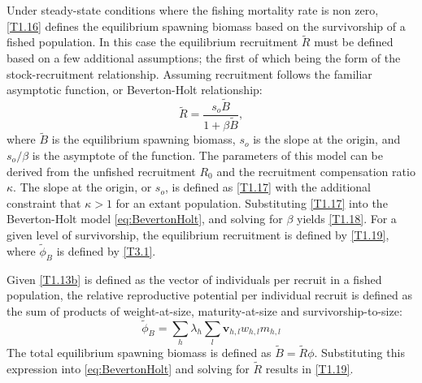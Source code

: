 \documentclass[12pt,letterpaper]{article}
\begin{document}
    Under steady-state conditions where the fishing mortality rate is non zero, \eqref{T1.16} defines the equilibrium spawning biomass based on the survivorship of a fished population.  In this case the equilibrium recruitment $\tilde{R}$ must be defined based on a few additional assumptions; the first of which being the form of the stock-recruitment relationship.  Assuming recruitment follows the familiar asymptotic function, or Beverton-Holt relationship:
    \begin{equation} \label{eq:BevertonHolt}
      \tilde{R} = \frac{s_o \tilde{B}}{1 + \beta \tilde{B}},
    \end{equation}
    where $\tilde{B}$ is the equilibrium spawning biomass, $s_o$ is the slope at the origin, and $s_o/\beta$ is the asymptote of the function. The parameters of this model can be derived from the unfished recruitment $R_0$ and the recruitment compensation ratio $\kappa$.  The slope at the origin, or $s_o$, is defined as \eqref{T1.17} with the additional constraint that $\kappa > 1$ for an extant population.  Substituting \eqref{T1.17} into the Beverton-Holt model \eqref{eq:BevertonHolt}, and solving  for $\beta$ yields \eqref{T1.18}.  For a given level of survivorship, the equilibrium recruitment is defined by \eqref{T1.19}, where $\tilde{\phi}_B$ is defined by \eqref{T3.1}.

    Given \eqref{T1.13b} is defined as the vector of individuals per recruit in a fished population, the relative reproductive potential per individual recruit is defined as the sum of products of weight-at-size, maturity-at-size and survivorship-to-size:
    \[
    \tilde{\phi}_B = \sum_h \lambda_h \sum_l  \bm{v}_{h,l} w_{h,l} m_{h,l}
    \]
    The total equilibrium spawning biomass is defined as $\tilde{B} = \tilde{R} \phi$.  Substituting this expression into \eqref{eq:BevertonHolt} and solving for $\tilde{R}$ results in \eqref{T1.19}.
\end{document}
